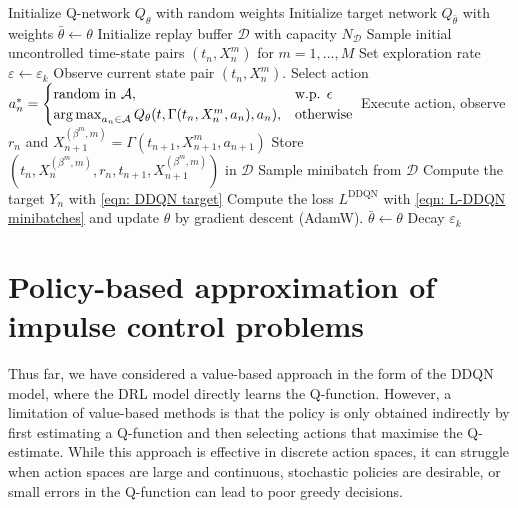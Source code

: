 \begin{algorithm}[h]
\caption{DDQN Training procedure}
\label{alg: DDQN Training procedure}
\begin{algorithmic}[1]
\STATE Initialize Q-network $Q_\theta$ with random weights
\STATE Initialize target network $Q_{\bar \theta}$ with weights $\bar \theta \gets \theta$
\STATE Initialize replay buffer $\mathcal{D}$ with capacity $N_\mathcal{D}$
\STATE Sample initial uncontrolled time-state pairs $(t_n,X_n^m)$ for $m=1, \ldots, M$
    \STATE Set exploration rate $\varepsilon \gets \varepsilon_k$
        \STATE Observe current state pair $(t_n, X^m_n)$.
        \STATE Select action $a_n^* = \begin{cases}
                \text{random in } \mathcal{A},  & \text{w.p. } \epsilon \\ \operatorname*{arg\,max}_{a_n \in \mathcal{A}} Q_\theta(t,\Gamma(t_n,X_n^m,a_n), a_n), & \text{otherwise} \end{cases}$ 
        \STATE Execute action, observe $r_n$ and $X^{(\beta^m,m)}_{n+1}=\Gamma(t_{n+1},X^m_{n+1},a_{n+1})$
        \STATE Store $(t_n, X^{(\beta^m,m)}_n, r_n, t_{n+1}, X^{(\beta^m,m)}_{n+1})$ in $\mathcal{D}$
        \STATE Sample minibatch from $\mathcal{D}$
        \STATE Compute the target $Y_n$ with \eqref{eqn: DDQN target}
        \STATE Compute the loss $L^{\text{DDQN}}$ with \eqref{eqn: L-DDQN minibatches} and update $\theta$ by gradient descent (AdamW). 
            \STATE $\bar \theta \gets \theta$
        \ENDIF
    \ENDFOR
    \STATE Decay $\varepsilon_k$
\ENDFOR
\end{algorithmic}
\end{algorithm}

\section{Policy-based approximation of impulse control problems}
\label{section: Policy-based approximation of impulse control problems}

Thus far, we have considered a value-based approach in the form of the DDQN model, where the DRL model directly learns the Q-function. However, a limitation of value-based methods is that the policy is only obtained indirectly by first estimating a Q-function and then selecting actions that maximise the Q-estimate. While this approach is effective in discrete action spaces, it can struggle when action spaces are large and continuous, stochastic policies are desirable, or small errors in the Q-function can lead to poor greedy decisions. 

